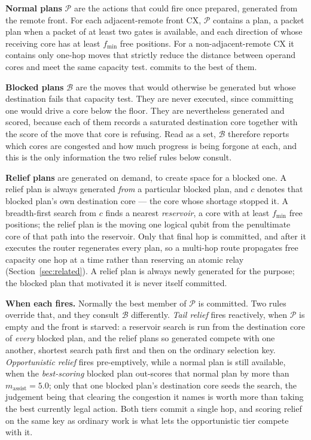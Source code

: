 \textbf{Normal plans} $\mathcal P$ are the actions that could fire once
prepared, generated from the remote front.  For each adjacent-remote front
CX, $\mathcal P$ contains a \TeleGate{} plan, a packet plan when a packet of
at least two gates is available, and each direction of \TeleData{} whose
receiving core has at least $f_\mathrm{min}$ free positions.  For a
non-adjacent-remote CX it contains only one-hop \TeleData{} moves that
strictly reduce the distance between operand cores and meet the same capacity
test.  \PORTER{} commits to the best of them.

\textbf{Blocked plans} $\mathcal B$ are the \TeleData{} moves that would
otherwise be generated but whose destination fails that capacity test.  They
are never executed, since committing one would drive a core below the floor.
They are nevertheless generated and scored, because each of them records a
saturated destination core together with the score of the move that core is
refusing.  Read as a set, $\mathcal B$ therefore reports which cores are
congested and how much progress is being forgone at each, and this is the
only information the two relief rules below consult.

\textbf{Relief plans} are generated on demand, to create space for a
blocked one.  A relief plan is always generated \emph{from} a particular
blocked plan, and $c$ denotes that blocked plan's own destination core ---
the core whose shortage stopped it.  A breadth-first search from $c$ finds a
nearest \emph{reservoir}, a core with at least $f_\mathrm{min}$ free
positions; the relief plan is the \TeleData{} moving one logical qubit from
the penultimate core of that path into the reservoir.
Only that final hop is committed, and after it executes the router
regenerates every plan, so a multi-hop route propagates free capacity one hop
at a time rather than reserving an atomic relay
(Section~\ref{sec:related}).  A relief plan is always newly generated for the
purpose; the blocked plan that motivated it is never itself committed.

\textbf{When each fires.}  Normally the best member of $\mathcal P$ is
committed.  Two rules override that, and they consult $\mathcal B$
differently.  \emph{Tail relief} fires reactively, when $\mathcal P$ is empty
and the front is starved: a reservoir search is run from the destination core
of \emph{every} blocked plan, and the relief plans so generated compete with
one another, shortest search path first and then on the ordinary selection
key.  \emph{Opportunistic relief} fires pre-emptively, while a normal plan is
still available, when the \emph{best-scoring} blocked plan out-scores that
normal plan by more than $m_\mathrm{assist}=5.0$; only that one blocked
plan's destination core seeds the search, the judgement being that clearing
the congestion it names is worth more than taking the best currently legal
action.  Both tiers commit a single hop, and scoring relief on the same key
as ordinary work is what lets the opportunistic tier compete with it.


